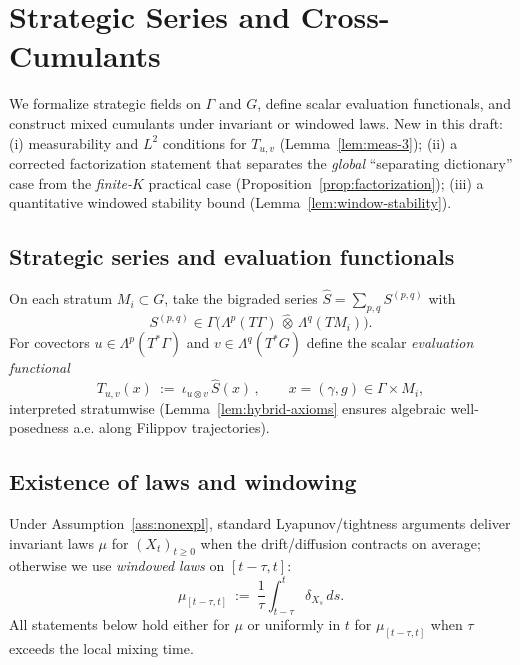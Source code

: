 \section{Strategic Series and Cross-Cumulants}\label{sec:stoch1}

We formalize strategic fields on $\Gamma$ and $G$, define scalar evaluation functionals, and construct mixed cumulants under invariant or windowed laws. New in this draft: (i) measurability and $L^2$ conditions for $T_{u,v}$ (Lemma~\ref{lem:meas-3}); (ii) a corrected factorization statement that separates the \emph{global} ``separating dictionary'' case from the \emph{finite-$K$} practical case (Proposition~\ref{prop:factorization}); (iii) a quantitative windowed stability bound (Lemma~\ref{lem:window-stability}).

\subsection{Strategic series and evaluation functionals}

On each stratum $M_i\subset G$, take the bigraded series $\hat S=\sum_{p,q}S^{(p,q)}$ with
\[
S^{(p,q)}\in \Gamma\big(\Lambda^p(T\Gamma)\,\hat\otimes\,\Lambda^q(TM_i)\big).
\]
For covectors $u\in\Lambda^p(T^*\Gamma)$ and $v\in\Lambda^q(T^*G)$ define the scalar \emph{evaluation functional}
\[
T_{u,v}(x)\ :=\ \iota_{u\otimes v}\,\hat S(x)\,,
\qquad x=(\gamma,g)\in \Gamma\times M_i,
\]
interpreted stratumwise (Lemma~\ref{lem:hybrid-axioms} ensures algebraic well-posedness a.e. along Filippov trajectories).

\subsection{Existence of laws and windowing}

Under Assumption~\ref{ass:nonexpl}, standard Lyapunov/tightness arguments deliver invariant laws $\mu$ for $(X_t)_{t\ge0}$ when the drift/diffusion contracts on average; otherwise we use \emph{windowed laws} on $[t-\tau,t]$:
\[
\mu_{[t-\tau,t]}\ :=\ \frac{1}{\tau}\int_{t-\tau}^{t}\delta_{X_s}\,ds.
\]
All statements below hold either for $\mu$ or uniformly in $t$ for $\mu_{[t-\tau,t]}$ when $\tau$ exceeds the local mixing time.

